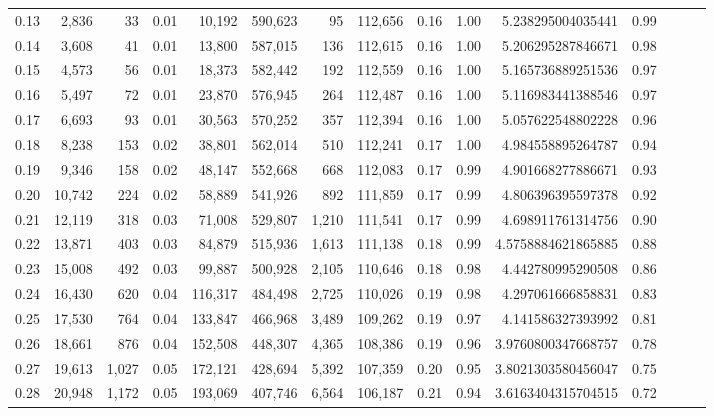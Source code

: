 \begin{tabular}{rrrrrrrrrrrrrrr}
0.13 &   2,836 &     33 &  0.01 &   10,192 &  590,623 &       95 &  112,656 &  0.16 &  1.00 &       5.238295004035441 &      0.99 \\
0.14 &   3,608 &     41 &  0.01 &   13,800 &  587,015 &      136 &  112,615 &  0.16 &  1.00 &       5.206295287846671 &      0.98 \\
0.15 &   4,573 &     56 &  0.01 &   18,373 &  582,442 &      192 &  112,559 &  0.16 &  1.00 &       5.165736889251536 &      0.97 \\
0.16 &   5,497 &     72 &  0.01 &   23,870 &  576,945 &      264 &  112,487 &  0.16 &  1.00 &       5.116983441388546 &      0.97 \\
0.17 &   6,693 &     93 &  0.01 &   30,563 &  570,252 &      357 &  112,394 &  0.16 &  1.00 &       5.057622548802228 &      0.96 \\
0.18 &   8,238 &    153 &  0.02 &   38,801 &  562,014 &      510 &  112,241 &  0.17 &  1.00 &       4.984558895264787 &      0.94 \\
0.19 &   9,346 &    158 &  0.02 &   48,147 &  552,668 &      668 &  112,083 &  0.17 &  0.99 &       4.901668277886671 &      0.93 \\
0.20 &  10,742 &    224 &  0.02 &   58,889 &  541,926 &      892 &  111,859 &  0.17 &  0.99 &       4.806396395597378 &      0.92 \\
0.21 &  12,119 &    318 &  0.03 &   71,008 &  529,807 &    1,210 &  111,541 &  0.17 &  0.99 &       4.698911761314756 &      0.90 \\
0.22 &  13,871 &    403 &  0.03 &   84,879 &  515,936 &    1,613 &  111,138 &  0.18 &  0.99 &      4.5758884621865885 &      0.88 \\
0.23 &  15,008 &    492 &  0.03 &   99,887 &  500,928 &    2,105 &  110,646 &  0.18 &  0.98 &       4.442780995290508 &      0.86 \\
0.24 &  16,430 &    620 &  0.04 &  116,317 &  484,498 &    2,725 &  110,026 &  0.19 &  0.98 &       4.297061666858831 &      0.83 \\
0.25 &  17,530 &    764 &  0.04 &  133,847 &  466,968 &    3,489 &  109,262 &  0.19 &  0.97 &       4.141586327393992 &      0.81 \\
0.26 &  18,661 &    876 &  0.04 &  152,508 &  448,307 &    4,365 &  108,386 &  0.19 &  0.96 &      3.9760800347668757 &      0.78 \\
0.27 &  19,613 &  1,027 &  0.05 &  172,121 &  428,694 &    5,392 &  107,359 &  0.20 &  0.95 &      3.8021303580456047 &      0.75 \\
0.28 &  20,948 &  1,172 &  0.05 &  193,069 &  407,746 &    6,564 &  106,187 &  0.21 &  0.94 &      3.6163404315704515 &      0.72 \\

\end{tabular}
